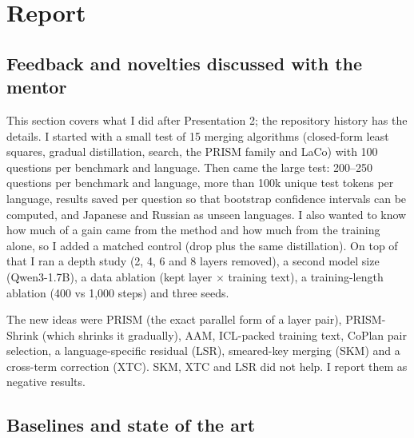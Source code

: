 \documentclass[11pt]{article}
\begin{document}
\section{Report}

\subsection{Feedback and novelties discussed with the mentor}


This section covers what I did after Presentation 2; the repository history has the details. I started with a small
test of 15 merging algorithms (closed-form least squares, gradual distillation, search, the PRISM family and LaCo)
with 100 questions per benchmark and language. Then came the large test: 200--250 questions per benchmark and
language, more than 100k unique test tokens per language, results saved per question so that bootstrap confidence
intervals can be computed, and Japanese and Russian as unseen languages. I also wanted to know how much of a gain
came from the method and how much from the training alone, so I added a matched control (drop plus the same
distillation). On top of that I ran a depth study (2, 4, 6 and 8 layers removed), a second model size (Qwen3-1.7B),
a data ablation (kept layer $\times$ training text), a training-length ablation (400 vs 1{,}000 steps) and three
seeds.

The new ideas were PRISM (the exact parallel form of a layer pair), PRISM-Shrink (which shrinks it gradually), AAM,
ICL-packed training text, CoPlan pair selection, a language-specific residual (LSR), smeared-key merging (SKM) and a
cross-term correction (XTC). SKM, XTC and LSR did not help. I report them as negative results.

\subsection{Baselines and state of the art}
\end{document}

